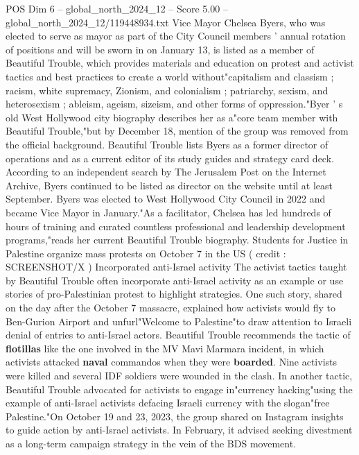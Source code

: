 \begin{textsample}{POS Dim 6 – global\_north\_2024\_12 – Score 5.00 – global\_north\_2024\_12/119448934.txt}  \label{ex:f6_pos_270}
Vice Mayor Chelsea Byers, who was elected to serve as mayor as part of the City Council members ' annual rotation of positions and will be sworn in on January 13, is listed as a member of Beautiful Trouble, which provides materials and education on protest and activist tactics and best practices to create a world without"capitalism and classism ; racism, white supremacy, Zionism, and colonialism ; patriarchy, sexism, and heterosexism ; ableism, ageism, sizeism, and other forms of oppression."Byer ' s old West Hollywood city biography describes her as a"core team member with Beautiful Trouble,"but by December 18, mention of the group was removed from the official background.
Beautiful Trouble lists Byers as a former director of operations and as a current editor of its study guides and strategy card deck.
According to an independent search by The Jerusalem Post on the Internet Archive, Byers continued to be listed as director on the website until at least September.
Byers was elected to West Hollywood City Council in 2022 and became Vice Mayor in January."As a facilitator, Chelsea has led hundreds of hours of training and curated countless professional and leadership development programs,"reads her current Beautiful Trouble biography.
Students for Justice in Palestine organize mass protests on October 7 in the US ( credit : SCREENSHOT/X ) Incorporated anti-Israel activity The activist tactics taught by Beautiful Trouble often incorporate anti-Israel activity as an example or use stories of pro-Palestinian protest to highlight strategies.
One such story, shared on the day after the October 7 massacre, explained how activists would fly to Ben-Gurion Airport and unfurl"Welcome to Palestine"to draw attention to Israeli denial of entries to anti-Israel actors.
Beautiful Trouble recommends the tactic of \textbf{flotillas} like the one involved in the MV Mavi Marmara incident, in which activists attacked \textbf{naval} commandos when they were \textbf{boarded}.
Nine activists were killed and several IDF soldiers were wounded in the clash.
In another tactic, Beautiful Trouble advocated for activists to engage in"currency hacking"using the example of anti-Israel activists defacing Israeli currency with the slogan"free Palestine."On October 19 and 23, 2023, the group shared on Instagram insights to guide action by anti-Israel activists.
In February, it advised seeking divestment as a long-term campaign strategy in the vein of the BDS movement.

\end{textsample}
